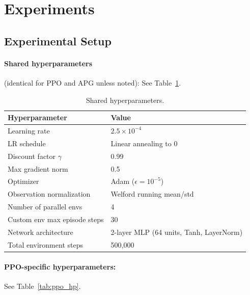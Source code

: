 \documentclass[11pt,a4paper]{article}
\begin{document}
\section{Experiments}
\label{sec:experiments}

\subsection{Experimental Setup}
\label{sec:setup}

\paragraph{Shared hyperparameters} (identical for PPO and APG unless noted): See Table~\ref{tab:shared_hp}.

\begin{table}[htbp]
  \centering
  \caption{Shared hyperparameters.}
  \label{tab:shared_hp}
  \begin{tabular}{@{}ll@{}}
    \toprule
    \textbf{Hyperparameter} & \textbf{Value} \\
    \midrule
    Learning rate                   & $2.5 \times 10^{-4}$ \\
    LR schedule                     & Linear annealing to 0 \\
    Discount factor $\gamma$        & 0.99 \\
    Max gradient norm               & 0.5 \\
    Optimizer                       & Adam ($\epsilon = 10^{-5}$) \\
    Observation normalization       & Welford running mean/std \\
    Number of parallel envs         & 4 \\
    Custom env max episode steps    & 30 \\
    Network architecture            & 2-layer MLP (64 units, Tanh, LayerNorm) \\
    Total environment steps         & 500{,}000 \\
    \bottomrule
  \end{tabular}
\end{table}

\paragraph{PPO-specific hyperparameters:} See Table~\ref{tab:ppo_hp}.
\end{document}

